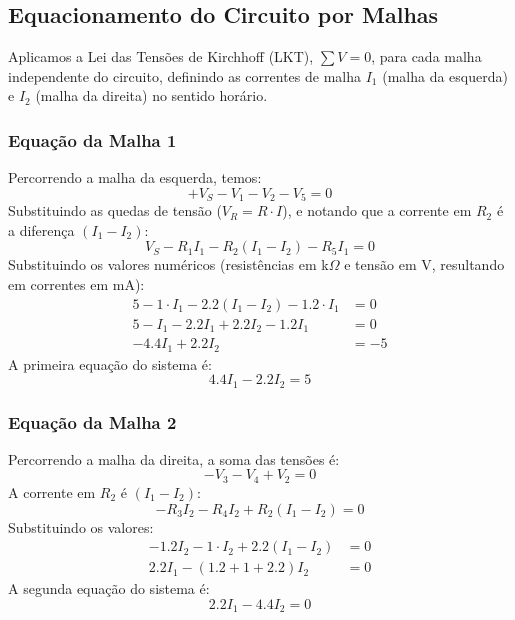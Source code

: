 \documentclass[a4paper, 12pt]{article}
\begin{document}
\subsection{Equacionamento do Circuito por Malhas}
Aplicamos a Lei das Tensões de Kirchhoff (LKT), $\sum V = 0$, para cada malha independente do circuito, definindo as correntes de malha $I_1$ (malha da esquerda) e $I_2$ (malha da direita) no sentido horário.

\subsubsection{Equação da Malha 1}
Percorrendo a malha da esquerda, temos:
\begin{equation}
+V_S - V_{1} - V_{2} - V_{5} = 0
\end{equation}
Substituindo as quedas de tensão ($V_R = R \cdot I$), e notando que a corrente em $R_2$ é a diferença $(I_1 - I_2)$:
\begin{equation}
V_S - R_1 I_1 - R_2 (I_1 - I_2) - R_5 I_1 = 0
\end{equation}
Substituindo os valores numéricos (resistências em k$\Omega$ e tensão em V, resultando em correntes em mA):
\begin{align*}
5 - 1 \cdot I_1 - 2.2(I_1 - I_2) - 1.2 \cdot I_1 &= 0 \\
5 - I_1 - 2.2 I_1 + 2.2 I_2 - 1.2 I_1 &= 0 \\
-4.4 I_1 + 2.2 I_2 &= -5
\end{align*}
A primeira equação do sistema é:
\begin{equation}
\label{eq:malha1}
4.4 I_1 - 2.2 I_2 = 5
\end{equation}

\subsubsection{Equação da Malha 2}
Percorrendo a malha da direita, a soma das tensões é:
\begin{equation}
-V_{3} - V_{4} + V_{2} = 0
\end{equation}
A corrente em $R_2$  é $(I_1 - I_2)$:
\begin{equation}
-R_3 I_2 - R_4 I_2 + R_2 (I_1 - I_2) = 0
\end{equation}
Substituindo os valores:
\begin{align*}
-1.2 I_2 - 1 \cdot I_2 + 2.2(I_1 - I_2) &= 0 \\
2.2 I_1 - (1.2 + 1 + 2.2)I_2 &= 0
\end{align*}
A segunda equação do sistema é:
\begin{equation}
\label{eq:malha2}
2.2 I_1 - 4.4 I_2 = 0
\end{equation}
\end{document}

